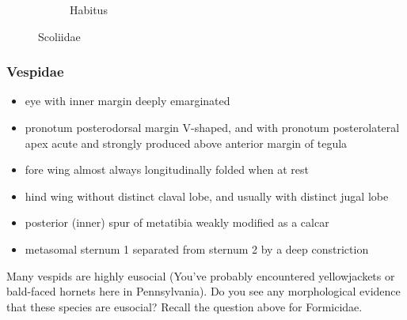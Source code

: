 \documentclass[letterpaper, 11pt]{article}
\begin{document}
\begin{figure}[ht!]
\begin{subfigure}[ht!]{0.38\textwidth}
        \caption{Habitus \citep[][Fig. 78]{goulet1993hymenoptera}}
        \label{fig:scoliid2}
    \end{subfigure}
    \caption{Scoliidae}\label{fig:scoliids}
\end{figure}

\subsubsection{Vespidae}
\begin{itemize}
\item eye with inner margin deeply emarginated 
\item pronotum posterodorsal margin V-shaped, and with pronotum posterolateral apex acute and strongly produced above anterior margin of tegula
\item fore wing almost always longitudinally folded when at rest 
\item hind wing without distinct claval lobe, and usually with distinct jugal lobe
\item posterior (inner) spur of metatibia weakly modified as a calcar 
\item metasomal sternum 1 separated from sternum 2 by a deep constriction
\end{itemize}

\noindent{}Many vespids are highly eusocial (You've probably encountered yellowjackets or bald-faced hornets here in Pennsylvania). Do you see any morphological evidence that these species are eusocial? Recall the question above for Formicidae.\\
\end{document}

